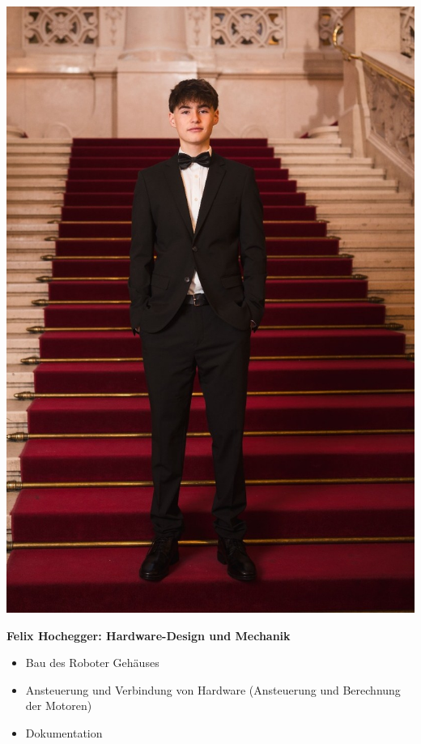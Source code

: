 \documentclass[ngerman,12pt,a4paper]{article}
\begin{document}
\begin{center}
			\begin{minipage}{0.18\textwidth}
				\includegraphics[width=\linewidth]{Pictures/felix}
				\label{fig:felix}
			\end{minipage}
			\hfill
			\begin{minipage}{0.65\textwidth}
				\vspace{-60pt}
				\textbf{Felix Hochegger: Hardware-Design und Mechanik}
				\begin{itemize}
					\item Bau des Roboter Gehäuses \vspace{-10pt}
					\item Ansteuerung und Verbindung von Hardware (Ansteuerung und Berechnung der Motoren) \vspace{-10pt}
					\item Dokumentation \vspace{-10pt}
				\end{itemize}
			\end{minipage}
			\end{center}
			\newpage
\end{document}
